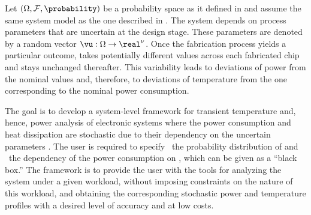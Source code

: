 Let $(\Omega, \mathcal{F}, \probability)$ be a probability space as it defined
in  and assume the same system model as the one
described in . The system depends on \nu process parameters
that are uncertain at the design stage. These parameters are denoted by a random
vector $\vu: \Omega \to \real^\nu$. Once the fabrication process yields a
particular outcome, \vu takes potentially different values across each
fabricated chip and stays unchanged thereafter. This variability leads to
deviations of power from the nominal values and, therefore, to deviations of
temperature from the one corresponding to the nominal power consumption.

The goal is to develop a system-level framework for transient temperature and,
hence, power analysis of electronic systems where the power consumption and heat
dissipation are stochastic due to their dependency on the uncertain parameters
\vu. The user is required to specify \one~the probability distribution of \vu
and \two~the dependency of the power consumption on \vu, which can be given as a
``black box.'' The framework is to provide the user with the tools for analyzing
the system under a given workload, without imposing constraints on the nature of
this workload, and obtaining the corresponding stochastic power \mp and
temperature \mq profiles with a desired level of accuracy and at low costs.
